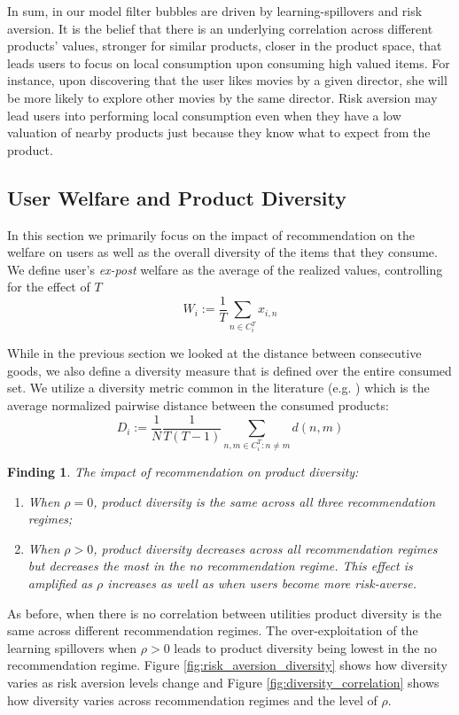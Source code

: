 \documentclass[sigconf]{acmart}
\newtheorem{finding}{Finding}
\begin{document}
In sum, in our model filter bubbles are driven by learning-spillovers and risk aversion. It is the belief that there is an underlying correlation across different products' values, stronger for similar products, closer in the product space, that leads users to focus on local consumption upon consuming high valued items. For instance, upon discovering that the user likes movies by a given director, she will be more likely to explore other movies by the same director. Risk aversion may lead users into performing local consumption even when they have a low valuation of nearby products just because they know what to expect from the product.
\par

\subsection{User Welfare and Product Diversity}
In this section we primarily focus on the impact of recommendation on the welfare on users as well as the overall diversity of the items that they consume. We define user's \textit{ex-post} welfare as the average of the realized values, controlling for the effect of $T$
$$W_i:= \frac{1}{T}\sum_{n \in C_i^T} x_{i,n}$$

While in the previous section we looked at the distance between consecutive goods, we also define a diversity measure that is defined over the entire consumed set. We utilize a diversity metric common in the literature (e.g. \cite{ziegler2005improving}) which is the average normalized pairwise distance between the consumed products:
$$D_i:=\frac{1}{N}\frac{1}{T(T-1)}\sum_{n,m \in C_i^T: n \ne m} d(n,m)$$

\begin{finding}\label{finding_diversity}
The impact of recommendation on product diversity:
\begin{enumerate}
\item When $\rho = 0$, product diversity is the same across all three recommendation regimes;
\item When $\rho > 0$, product diversity decreases across all recommendation regimes but decreases the most in the no recommendation regime. This effect is amplified as $\rho$ increases as well as when users become more risk-averse.
\end{enumerate}
\end{finding}

As before, when there is no correlation between utilities product diversity is the same across different recommendation regimes. The over-exploitation of the learning spillovers when $\rho > 0$ leads to product diversity being lowest in the no recommendation regime.  Figure \ref{fig:risk_aversion_diversity} shows how diversity varies as risk aversion levels change and Figure \ref{fig:diversity_correlation} shows how diversity varies across recommendation regimes and the level of $\rho$.
\end{document}
